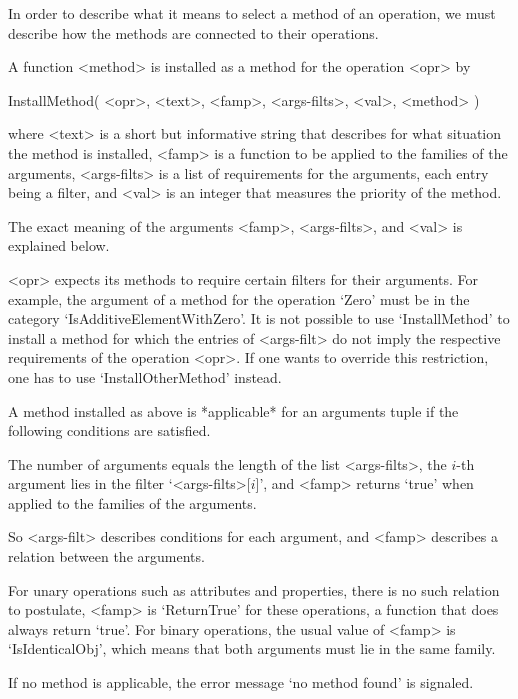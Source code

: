 
In order to describe what it means to select a method of an operation,
we must describe how the methods are connected to their operations.

A function <method> is installed as a method for the operation <opr> by

\>InstallMethod( <opr>, <text>, <famp>, <args-filts>, <val>, <method> )

where <text> is a short but informative string that describes for what
situation the method is installed,
<famp> is a function to be applied to the families of the arguments,
<args-filts> is a list of requirements for the arguments,
each entry being a filter,
and <val> is an integer that measures the priority of the method.

The exact meaning of the arguments <famp>, <args-filts>,
and <val> is explained below.

<opr> expects its methods to require certain filters for their arguments.
For example, the argument of a method for the operation `Zero' must be
in the category `IsAdditiveElementWithZero'.
It is not possible to use `InstallMethod' to install a method for which
the entries of <args-filt> do not imply the respective requirements of
the operation <opr>.
If one wants to override this restriction,
one has to use `InstallOtherMethod' instead.



A method installed as above is *applicable* for an arguments tuple
if the following conditions are satisfied.

The number of arguments equals the length of the list <args-filts>,
the $i$-th argument lies in the filter `<args-filts>[$i$]',
and <famp> returns `true' when applied to the families of the arguments.

So <args-filt> describes conditions for each argument,
and <famp> describes a relation between the arguments.

For unary operations such as attributes and properties,
there is no such relation to postulate,
<famp> is `ReturnTrue' for these operations,
a function that does always return `true'.
For binary operations, the usual value of <famp> is `IsIdenticalObj',
which means that both arguments must lie in the same family.

If no method is applicable,
the error message `no method found' is signaled.

